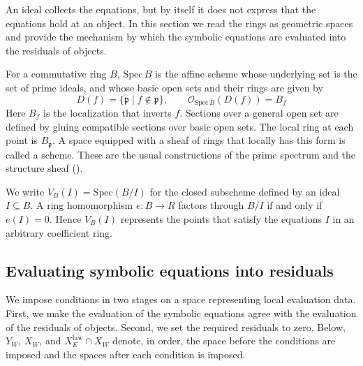 An ideal collects the equations, but by itself it does not express that the equations hold
at an object. In this section we read the rings as geometric spaces and provide the
mechanism by which the symbolic equations are evaluated into the residuals of objects.

\begin{definition}\label{def:2.5}

For a commutative ring $B$, $\mathrm{Spec}\,B$ is the affine scheme whose underlying set is
the set of prime ideals, and whose basic open sets and their rings are given by
\begin{equation*}
D(f)=\{\mathfrak{p}\mid f\notin\mathfrak{p}\},
\qquad
\mathcal{O}_{\mathrm{Spec}\,B}(D(f))=B_f
\tag{2.3}\label{eq:2.3}
\end{equation*}
Here $B_f$ is the localization that inverts $f$. Sections over a general open set are
defined by gluing compatible sections over basic open sets. The local ring at each point is
$B_{\mathfrak{p}}$. A space equipped with a sheaf of rings that locally has this form is
called a scheme. These are the usual constructions of the prime spectrum and the structure
sheaf
(\cite[\href{https://stacks.math.columbia.edu/tag/01HR}{\S26.5, Tag~01HR}]{Stacks}).

We write $V_B(I)=\mathrm{Spec}(B/I)$ for the closed subscheme defined by an ideal
$I\subseteq B$. A ring homomorphism $e:B\to R$ factors through $B/I$ if and only if
$e(I)=0$. Hence $V_B(I)$ represents the points that satisfy the equations $I$ in an
arbitrary coefficient ring.

\end{definition}

\subsection*{Evaluating symbolic equations into residuals}

We impose conditions in two stages on a space representing local evaluation data. First, we
make the evaluation of the symbolic equations agree with the evaluation of the residuals of
objects. Second, we set the required residuals to zero. Below, $Y_W$, $X_W$, and
$X_E^{\mathrm{law}}\cap X_W$ denote, in order, the space before the conditions are imposed
and the spaces after each condition is imposed.

